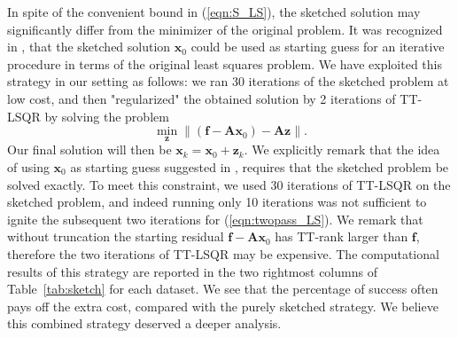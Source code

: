 \documentclass{siamart190516}
\newcommand{\bx}{\bm x}
\begin{document}
In spite of the convenient bound in (\ref{eqn:S_LS}), the sketched solution may
significantly differ from the minimizer of the original problem.
It was recognized in \cite{doi:10.1137/23M1551973}, \cite{Rokhlin.Tygert.08}
that the sketched solution $\bx_0$ could be used as starting guess for an
iterative procedure in terms of the original least squares problem.
We have exploited this strategy in our setting as follows: we ran 30 iterations
of the sketched problem at low cost, and then "regularized" the obtained
solution by 2 iterations of TT-LSQR by solving the problem
\begin{equation}\label{eqn:twopass_LS}
\min_{\bm z} \|(\bm f-{\mathcal {\bm A}}  \bx_0) - {\mathcal {\bm A}}  \bm z\|.
\end{equation}
Our final solution will then be $\bx_k=\bx_0 + \bm z_k$. We explicitly remark
that the idea of using $\bx_0$ as starting guess suggested in \cite{doi:10.1137/23M1551973}, \cite{Rokhlin.Tygert.08} requires
that the sketched problem be solved exactly. To meet this constraint, we used 30 iterations of TT-LSQR on the sketched problem, and indeed running only 10 iterations was not sufficient to ignite the subsequent two iterations for  (\ref{eqn:twopass_LS}).
We remark that without truncation
the starting residual $\bm f -{\mathcal {\bm A}}  \bx_0$ has TT-rank larger than
$\bm f$, therefore the two iterations of TT-LSQR may be expensive.
%
The computational results of this strategy are reported in the two rightmost columns of Table~\ref{tab:sketch} for each
dataset.
We see that the percentage of success 
often pays off the extra cost, compared with the purely sketched
strategy. We believe this combined strategy deserved
a deeper analysis.



\end{document}
